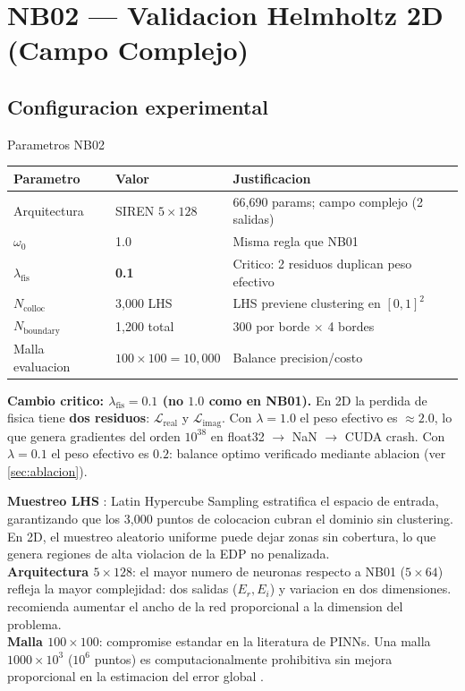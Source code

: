 \documentclass[12pt,a4paper]{article}
\begin{document}
\section{NB02 --- Validacion Helmholtz 2D (Campo Complejo)}

\subsection{Configuracion experimental}

\begin{definbox}{Parametros NB02}
\begin{tabular}{lll}
\toprule
Parametro & Valor & Justificacion \\
\midrule
Arquitectura & SIREN $5\times128$ & 66,690 params; campo complejo (2 salidas) \\
$\omega_0$ & 1.0 & Misma regla que NB01 \\
$\lambda_\text{fis}$ & \textbf{0.1} & Critico: 2 residuos duplican peso efectivo \\
$N_\text{colloc}$ & 3,000 LHS & LHS previene clustering en $[0,1]^2$ \\
$N_\text{boundary}$ & 1,200 total & 300 por borde $\times$ 4 bordes \\
Malla evaluacion & $100\times100 = 10{,}000$ & Balance precision/costo \\
\bottomrule
\end{tabular}
\end{definbox}

\begin{warnbox}
\textbf{Cambio critico: $\lambda_\text{fis} = 0.1$ (no $1.0$ como en NB01).}
En 2D la perdida de fisica tiene \textbf{dos residuos}: $\mathcal{L}_\text{real}$ y
$\mathcal{L}_\text{imag}$. Con $\lambda = 1.0$ el peso efectivo es $\approx 2.0$,
lo que genera gradientes del orden $10^{38}$ en float32 $\to$ NaN $\to$ CUDA crash.
Con $\lambda = 0.1$ el peso efectivo es $0.2$: balance optimo verificado mediante
ablacion (ver \cref{sec:ablacion}).
\end{warnbox}

\begin{litbox}
\textbf{Muestreo LHS} \parencite{mckay1979}: Latin Hypercube Sampling estratifica
el espacio de entrada, garantizando que los 3,000 puntos de colocacion cubran
el dominio sin clustering. En 2D, el muestreo aleatorio uniforme puede dejar zonas
sin cobertura, lo que genera regiones de alta violacion de la EDP no penalizada.\\[4pt]
\textbf{Arquitectura $5\times128$}: el mayor numero de neuronas respecto a NB01
($5\times64$) refleja la mayor complejidad: dos salidas ($E_r, E_i$) y variacion
en dos dimensiones. \textcite{sitzmann2020} recomienda aumentar el ancho de la
red proporcional a la dimension del problema.\\[4pt]
\textbf{Malla $100\times100$}: compromise estandar en la literatura de PINNs.
Una malla $1000\times10^3$ ($10^6$ puntos) es computacionalmente prohibitiva sin
mejora proporcional en la estimacion del error global \parencite{raissi2019}.
\end{litbox}
\end{document}
